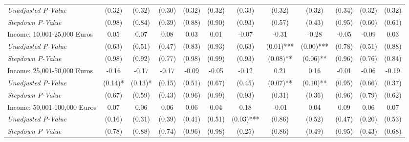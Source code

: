 \begin{tabular}{l c c c c c c c c c c c}
\quad \textit{Unadjusted P-Value} & (0.32) & (0.32) & (0.30) & (0.32) & (0.32) & (0.33) & (0.32) & (0.32) & (0.34) & (0.32) & (0.32) \\
\quad \textit{Stepdown P-Value} & (0.98) & (0.84) & (0.39) & (0.88) & (0.90) & (0.93) & (0.57) & (0.43) & (0.95) & (0.60) & (0.61) \\
Income: 10,001-25,000 Euros & 0.05 & 0.07 & 0.08 & 0.03 & 0.01 & -0.07 & -0.31 & -0.28 & -0.05 & -0.09 & 0.03 \\
\quad \textit{Unadjusted P-Value} & (0.63) & (0.51) & (0.47) & (0.83) & (0.93) & (0.63) & (0.01)*** & (0.00)*** & (0.78) & (0.51) & (0.88) \\
\quad \textit{Stepdown P-Value} & (0.98) & (0.92) & (0.77) & (0.98) & (0.99) & (0.93) & (0.08)** & (0.06)** & (0.96) & (0.76) & (0.84) \\
Income: 25,001-50,000 Euros & -0.16 & -0.17 & -0.17 & -0.09 & -0.05 & -0.12 & 0.21 & 0.16 & -0.01 & -0.06 & -0.19 \\
\quad \textit{Unadjusted P-Value} & (0.14)* & (0.13)* & (0.15) & (0.51) & (0.67) & (0.45) & (0.07)** & (0.10)** & (0.95) & (0.66) & (0.37) \\
\quad \textit{Stepdown P-Value} & (0.67) & (0.59) & (0.43) & (0.96) & (0.99) & (0.93) & (0.31) & (0.36) & (0.96) & (0.79) & (0.62) \\
Income: 50,001-100,000 Euros & 0.07 & 0.06 & 0.06 & 0.06 & 0.04 & 0.18 & -0.01 & 0.04 & 0.09 & 0.06 & 0.07 \\
\quad \textit{Unadjusted P-Value} & (0.16) & (0.31) & (0.39) & (0.41) & (0.51) & (0.03)*** & (0.86) & (0.52) & (0.47) & (0.20) & (0.53) \\
\quad \textit{Stepdown P-Value} & (0.78) & (0.88) & (0.74) & (0.96) & (0.98) & (0.25) & (0.86) & (0.49) & (0.95) & (0.43) & (0.68) \\
\bottomrule
\end{tabular}
